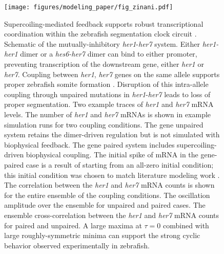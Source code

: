 \documentclass[11pt]{article}
\begin{document}
\begin{figure}[htbp]
    \centering
    {\texttt{[image: figures/modeling\_paper/fig\_zinani.pdf]}
    \label{fig:her1_her7_cartoon}
    \label{fig:zinani_summary_cartoon}
    \label{fig:zinani_mRNA_behavior}
    \label{fig:zinani_correlation_coeff}
    \label{fig:zinani_oscillation_amplitude}
    \label{fig:zinani_cross_correlation}
    }
\end{figure}
\begin{figure}[htbp]
    \ContinuedFloat
    \caption{Supercoiling-mediated feedback supports robust transcriptional coordination within the zebrafish segmentation clock circuit .
         Schematic of the mutually-inhibitory \textit{her1}-\textit{her7} system. Either \textit{her1-her1} dimer or a \textit{hes6-her7} dimer can bind to either promoter, preventing transcription of the downstream gene, either \textit{her1} or \textit{her7}.
         Coupling between \textit{her1}, \textit{her7} genes on the same allele supports proper zebrafish somite formation \parencite{zinaniPairingSegmentationClock2021}. Disruption of this intra-allele coupling through unpaired mutations in \textit{her1}-\textit{her7} leads to loss of proper segmentation.
         Two example  traces of \textit{her1} and \textit{her7} mRNA levels.  The number of \textit{her1} and \textit{her7} mRNAs is shown in example simulation runs for two coupling conditions. The gene unpaired system retains the dimer-driven regulation but is not simulated with biophysical feedback. The gene paired system includes supercoiling-driven biophysical coupling. The initial spike of mRNA in the gene-paired case is a result of starting from an all-zero initial condition; this initial condition was chosen to match literature modeling work \parencite{zinaniPairingSegmentationClock2021}.
         The correlation between the \textit{her1} and \textit{her7} mRNA counts is shown for the entire ensemble of the coupling conditions. 
         The oscillation amplitude over the ensemble for unpaired and paired cases.
         The ensemble cross-correlation between the \textit{her1} and \textit{her7} mRNA counts for paired and unpaired. A large maxima at \(\tau = 0\) combined with large roughly-symmetric minima can support the strong cyclic behavior observed experimentally in zebrafish.
    } \label{fig:top:her1_her7}
\end{figure}
\end{document}
